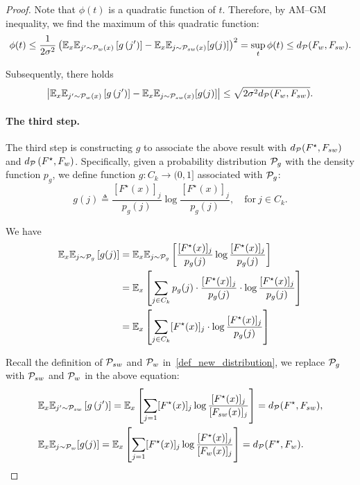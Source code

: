 \begin{proof}
Note that $\phi(t)$ is a quadratic function of $t$.
Therefore, by AM–GM inequality, we find the maximum of this quadratic function:
\begin{align*}
    \phi(t) \le \frac{1}{2\sigma^2}\left(\mathbb{E}_x\mathbb{E}_{j^{\prime} \sim \mathcal{P}_w(x)}\left[g\left(j^{\prime}\right)\right]-\mathbb{E}_x\mathbb{E}_{j \sim \mathcal{P}_{sw}(x)}[g(j)]\right)^2 = \sup _t \phi(t) \le d_\mathcal{P}(F_w, F_{sw}).
\end{align*}

Subsequently, there holds
\begin{align} \label{ineq:lower_upper_kl_loss}
\left|\mathbb{E}_x\mathbb{E}_{j^{\prime} \sim \mathcal{P}_w(x)}\left[g\left(j^{\prime}\right)\right]-\mathbb{E}_x\mathbb{E}_{j \sim \mathcal{P}_{sw}(x)}[g(j)]\right| \le \sqrt{2\sigma^2 d_\mathcal{P}(F_w, F_{sw})}.
\end{align}

\paragraph{The third step.}
The third step is constructing $g$ to associate the above result with $d_\mathcal{P}(F^\star, F_{sw})$ and $d_\mathcal{P}\left( F^\star, F_w  \right)$.
Specifically, given a probability distribution $\mathcal{P}_g$ with the density function $p_g$, we define function $g: C_k \to (0,1]$ associated with $\mathcal{P}_g$: 
$$g(j) \triangleq \frac{[F^\star(x)]_j}{p_g(j)} \log \frac{[F^\star(x)]_j}{p_g(j)}, \quad \text{for} \ j \in C_k.$$

We have
\begin{align*}
    \mathbb{E}_x\mathbb{E}_{j \sim \mathcal{P}_g} \left[g(j)\right] & = \mathbb{E}_x \mathbb{E}_{j \sim \mathcal{P}_g} \left[\frac{[F^\star(x)]_j}{p_g(j)} \log \frac{[F^\star(x)]_j}{p_g(j)} \right] \\
    & = \mathbb{E}_x \left[\sum_{j \in C_k} p_g(j) \cdot \frac{[F^\star(x)]_j}{p_g(j)} \cdot \log \frac{[F^\star(x)]_j}{p_g(j)} \right] \\
    & = \mathbb{E}_x \left[\sum_{j \in C_k} [F^\star(x)]_j \cdot \log \frac{[F^\star(x)]_j}{p_g(j)} \right]
\end{align*}

Recall the definition of $\mathcal{P}_{sw}$ and $\mathcal{P}_w$ in~\eqref{def_new_distribution}, we replace $\mathcal{P}_g$ with $\mathcal{P}_{sw}$ and $\mathcal{P}_w$ in the above equation:
\begin{align*}
    & \mathbb{E}_x\mathbb{E}_{j^{\prime} \sim \mathcal{P}_{sw}}\left[g\left(j^{\prime}\right)\right] = \mathbb{E}_x \left[ \sum_{j=1} [F^\star(x)]_j \log \frac{[F^\star(x)]_j}{[F_{sw}(x)]_j} \right] = d_\mathcal{P}(F^\star, F_{sw}), \\
    & \mathbb{E}_x\mathbb{E}_{j \sim \mathcal{P}_w}[g(j)] = \mathbb{E}_x \left[ \sum_{j=1} [F^\star(x)]_j \log \frac{[F^\star(x)]_j}{[F_{w}(x)]_j} \right] = d_\mathcal{P}(F^\star, F_{w}).
\end{align*}


\end{proof}
